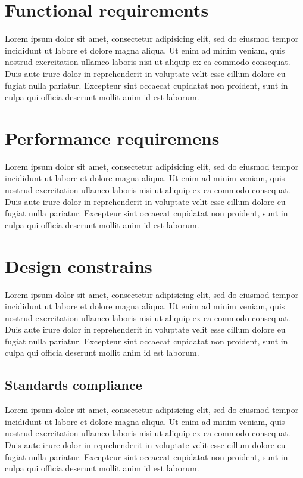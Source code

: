 \documentclass{report}
\begin{document}
	
	\section{Functional requirements}
	Lorem ipsum dolor sit amet, consectetur adipisicing elit, sed do eiusmod
	tempor incididunt ut labore et dolore magna aliqua. Ut enim ad minim veniam,
	quis nostrud exercitation ullamco laboris nisi ut aliquip ex ea commodo
	consequat. Duis aute irure dolor in reprehenderit in voluptate velit esse
	cillum dolore eu fugiat nulla pariatur. Excepteur sint occaecat cupidatat non
	proident, sunt in culpa qui officia deserunt mollit anim id est laborum.
	
	
	\section{Performance requiremens}
	Lorem ipsum dolor sit amet, consectetur adipisicing elit, sed do eiusmod
	tempor incididunt ut labore et dolore magna aliqua. Ut enim ad minim veniam,
	quis nostrud exercitation ullamco laboris nisi ut aliquip ex ea commodo
	consequat. Duis aute irure dolor in reprehenderit in voluptate velit esse
	cillum dolore eu fugiat nulla pariatur. Excepteur sint occaecat cupidatat non
	proident, sunt in culpa qui officia deserunt mollit anim id est laborum.
	
	
	\section{Design constrains}
	Lorem ipsum dolor sit amet, consectetur adipisicing elit, sed do eiusmod
	tempor incididunt ut labore et dolore magna aliqua. Ut enim ad minim veniam,
	quis nostrud exercitation ullamco laboris nisi ut aliquip ex ea commodo
	consequat. Duis aute irure dolor in reprehenderit in voluptate velit esse
	cillum dolore eu fugiat nulla pariatur. Excepteur sint occaecat cupidatat non
	proident, sunt in culpa qui officia deserunt mollit anim id est laborum.
	
	
	\subsection{Standards compliance}
	Lorem ipsum dolor sit amet, consectetur adipisicing elit, sed do eiusmod
	tempor incididunt ut labore et dolore magna aliqua. Ut enim ad minim veniam,
	quis nostrud exercitation ullamco laboris nisi ut aliquip ex ea commodo
	consequat. Duis aute irure dolor in reprehenderit in voluptate velit esse
	cillum dolore eu fugiat nulla pariatur. Excepteur sint occaecat cupidatat non
	proident, sunt in culpa qui officia deserunt mollit anim id est laborum.
	
\end{document}
